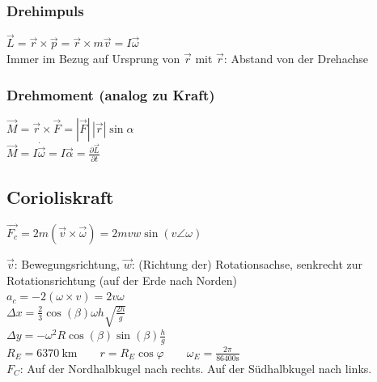 \begin{sectionbox}
    \subsubsection{Drehimpuls}
    $\vec L=\vec r\times \vec p = \vec r \times m\vec v = I \vec \omega$ \\
    Immer im Bezug auf Ursprung von $\vec r$ mit $\vec r$: Abstand von der Drehachse

    \subsubsection{Drehmoment (analog zu Kraft)}
    $\vec M=\vec r\times \vec F=|\vec F| \, |\vec r|  \sin \alpha$\\
    $\vec M=I  \dot{\vec{\omega}}=I\vec \alpha=\frac{\partial \vec L}{\partial t}$
\end{sectionbox}

\begin{sectionbox}
    \subsection{Corioliskraft}
    \begin{emphbox}
        $\vec{F_c}=2m(\vec v\times \vec \omega)= 2m v w   \sin{(v\angle \omega)}$
    \end{emphbox}
    $\vec v$: Bewegungsrichtung, $\vec w$: (Richtung der) Rotationsachse, senkrecht zur Rotationsrichtung (auf der Erde nach Norden)\\
    $a_c=-2(\omega \times v)=2v\omega$\\
    $\Delta x= \frac{2}{3}\cos (\beta) \omega h \sqrt{\frac{2h}{g}}$\\
    $\Delta y = -\omega^2R\cos (\beta) \sin (\beta) \frac{h}{g}$\\
    $R_E=\SI{6370}{\kilo \meter} \qquad r=R_E \cos \varphi \qquad \omega_E=\frac{2\pi}{86400\si{\second}}$\\
    $F_C$: Auf der Nordhalbkugel nach rechts. Auf der Südhalbkugel nach links.
\end{sectionbox}

